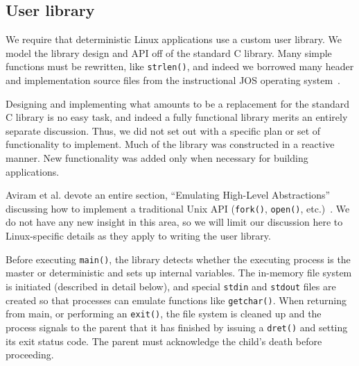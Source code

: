 \fi

\subsection{User library}
We require that deterministic Linux applications use a custom user library.
We model the library design and API off of the standard C library. Many simple
functions must be rewritten, like {\tt strlen()}, and indeed we borrowed
many header and implementation source files from the instructional JOS operating
system~\cite{josos}.

Designing and implementing what amounts to be a replacement for the standard C
library is no easy task, and indeed a fully functional library merits an
entirely separate discussion. Thus, we did not set out with a specific plan or
set of functionality to implement. Much of the library was constructed in a
reactive manner. New functionality was added only when necessary for building
applications.

Aviram et al. devote an entire section, ``Emulating High-Level Abstractions''
discussing how to implement a traditional Unix API ({\tt fork()}, {\tt open()},
etc.)~\cite{Aviram10}. We do not have any new insight in this area, so we will
limit our discussion here to Linux-specific details as they apply to writing the
user library.

\iffalse
The point of the user library presented with this research
is to demonstrate how higher level abstractions, like fork-join, can be
emulated. As already demonstrated in the ``Emulating High-Level Abstractions''
in Aviram et al.'s Determinator paper, many familiar abstractions can be
built on top of the three syscall kernel design. We provide no new insight
in this area, except for having a library that can run useful applications on
Linux and vastly improving the in memory file system.

Processes use a {\tt fork()} and {\tt join()} model for process management,
specifying the process ID of the child. The in memory file system is an
integral part of the user library. Processes can use {\tt dput()} and
{\tt dget()} to copy memory among processes, but applications can instead use
the file system to pass input and output among each other. For example, we
emulate {\tt stdout} and {\tt stdin} by using special files in the file system.
\fi

Before executing {\tt main()}, the library detects whether the executing
process is the master or deterministic and sets up internal variables. The
in-memory file system is initiated (described in detail below), and special
{\tt stdin} and {\tt stdout} files are created so that processes can emulate
functions like {\tt getchar()}. When returning from main, or performing an
{\tt exit()}, the file system is cleaned up and the process signals to the
parent that it has finished by issuing a {\tt dret()} and setting its exit
status code. The parent must acknowledge the child's death before proceeding.

